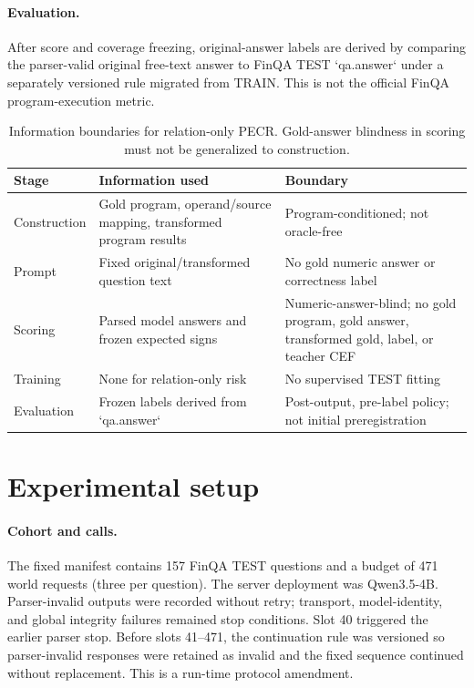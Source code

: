\documentclass[11pt]{article}
\begin{document}
\paragraph{Evaluation.} After score and coverage freezing, original-answer labels are derived by comparing the parser-valid original free-text answer to FinQA TEST `qa.answer` under a separately versioned rule migrated from TRAIN. This is not the official FinQA program-execution metric.

\begin{table}[t]
\centering\small
\begin{tabularx}{\columnwidth}{@{}p{}X p{}@{}}
\toprule
Stage & Information used & Boundary \\
\midrule
Construction & Gold program, operand/source mapping, transformed program results & Program-conditioned; not oracle-free \\
Prompt & Fixed original/transformed question text & No gold numeric answer or correctness label \\
Scoring & Parsed model answers and frozen expected signs & Numeric-answer-blind; no gold program, gold answer, transformed gold, label, or teacher CEF \\
Training & None for relation-only risk & No supervised TEST fitting \\
Evaluation & Frozen labels derived from `qa.answer` & Post-output, pre-label policy; not initial preregistration \\
\bottomrule
\end{tabularx}
\caption{Information boundaries for relation-only PECR. Gold-answer blindness in scoring must not be generalized to construction.}
\label{tab:boundary}
\end{table}

\section{Experimental setup}
\paragraph{Cohort and calls.} The fixed manifest contains 157 FinQA TEST questions and a budget of 471 world requests (three per question). The server deployment was Qwen3.5-4B. Parser-invalid outputs were recorded without retry; transport, model-identity, and global integrity failures remained stop conditions. Slot 40 triggered the earlier parser stop. Before slots 41--471, the continuation rule was versioned so parser-invalid responses were retained as invalid and the fixed sequence continued without replacement. This is a run-time protocol amendment.
\end{document}
